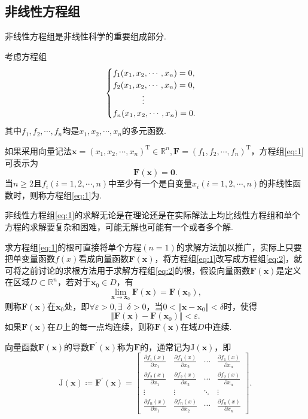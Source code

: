 \documentclass[cn,12pt,founder,a4paper]{elegantpaper}
\newcommand*{\bbR}{\mathbb{R}}
\newcommand*{\transpose}{\mathrm{T}}
\newcommand*{\exist}{\exists\mathop{}\!}
\newcommand*{\J}{\b{\mathrm{J}}}
\renewcommand*{\emph}[1]{{\heiti{#1}}}
\renewcommand*{\b}{\boldsymbol}
\begin{document}
\subsection{非线性方程组}
非线性方程组是非线性科学的重要组成部分.\par
考虑方程组
\begin{equation}\label{eq:1}
  \begin{cases}
    f_1(x_1,x_2,\cdots,x_n)=0,\\
    f_2(x_1,x_2,\cdots,x_n)=0,\\
    \hspace*{3.5em}\vdots\\
    f_n(x_1,x_2,\cdots,x_n)=0.
  \end{cases}
\end{equation}
其中\(f_1,f_2,\cdots,f_n\)均是\(x_1,x_2,\cdots,x_n\)的多元函数.\par 
如果采用向量记法\(\b{x}=(x_1,x_2,\cdots,x_n)^\transpose\in\bbR^n,\b{F}=(f_1,f_2,\cdots,f_n)^\transpose\)，方程组\eqref{eq:1}可表示为
\begin{equation}\label{eq:2}
  \b{F}(\b{x})=\b{0}.
\end{equation}
当\(n\geqslant 2\)且\(f_i(i=1,2,\cdots,n)\)中至少有一个是自变量\(x_i(i=1,2,\cdots,n)\)的非线性函数时，则称方程组\eqref{eq:1}为\emph{非线性方程组}.\par
非线性方程组\eqref{eq:1}的求解无论是在理论还是在实际解法上均比线性方程组和单个方程的求解要复杂和困难，可能无解也可能有一个或者多个解.\par
求方程组\eqref{eq:1}的根可直接将单个方程\((n=1)\)的求解方法加以推广，实际上只要把单变量函数\(f(x)\)看成向量函数\(\b{F}(\b{x})\)，将方程组\eqref{eq:1}改写成方程组\eqref{eq:2}，就可将之前讨论的求根方法用于求解方程组\eqref{eq:2}的根，假设向量函数\(\b{F}(\b{x})\)是定义在区域\(D\subset\bbR^n\)，若对于\(\b{x}_0\in D\)，有
\[\lim_{\b{x}\to\b{x}_0}\b{F}(\b{x})=\b{F}(\b{x}_0),\]
则称\(\b{F}(\b{x})\)在\(\b{x}_0\)处\emph{连续}，即\(\forall\varepsilon>0,\exist\delta>0\)，当\(0<\Vert\b{x}-\b{x}_0\Vert<\delta\)时，使得
\[\Vert\b{F}(\b{x})-\b{F}(\b{x}_0)\Vert<\varepsilon.\]
如果\(\b{F}(\b{x})\)在\(D\)上的每一点均连续，则称\(\b{F}(\b{x})\)在域\(D\)中连续.\par
向量函数\(\b{F}(\b{x})\)的导数\(\b{F}^\prime(\b{x})\)称为\(\b{F}\)的\emph{雅克比矩阵}，通常记为\(\J(\b{x})\)，即
\begin{equation}\label{eq:3}
  \J(\b{x})\coloneqq\b{F}^\prime(\b{x})=
  \begin{bmatrix}
    \frac{\partial f_1(x)}{\partial x_1}&\frac{\partial f_1(x)}{\partial x_2}&\cdots&\frac{\partial f_1(x)}{\partial x_n}\\[2pt]
    \frac{\partial f_2(x)}{\partial x_1}&\frac{\partial f_2(x)}{\partial x_2}&\cdots&\frac{\partial f_2(x)}{\partial x_n}\\[2pt]
    \vdots&\vdots&\ddots&\vdots\\[2pt]
    \frac{\partial f_n(x)}{\partial x_1}&\frac{\partial f_n(x)}{\partial x_2}&\cdots&\frac{\partial f_n(x)}{\partial x_n}
  \end{bmatrix}.
\end{equation}
\end{document}
